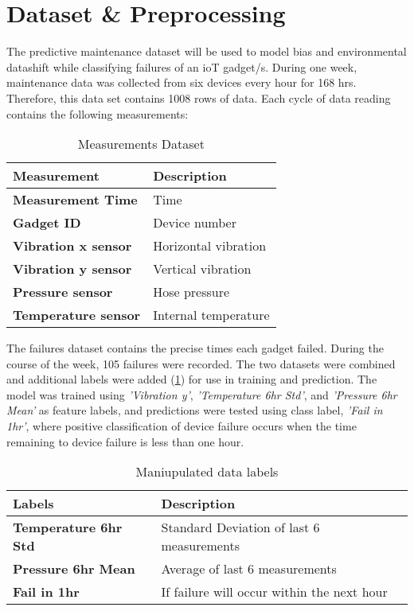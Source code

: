 \section{Dataset \& Preprocessing}
The predictive maintenance dataset \cite{ahonen} will be used to model bias and environmental datashift while classifying failures of an ioT gadget/s.
During one week, maintenance data was collected from six devices every hour for 168 hrs.
Therefore, this data set contains 1008 rows of data. 
Each cycle of data reading contains the following measurements: 

\begin{table}[H]
    \begin{center}
        \caption{Measurements Dataset} 
        \begin{tabular}{ ll } 
         \toprule
         \textbf{Measurement} & \textbf{Description} \\  [0.5ex] 
         \midrule
         \textbf{Measurement Time} & Time \\
         \textbf{Gadget ID} & Device number \\
         \textbf{Vibration x sensor} & Horizontal vibration \\ 
         \textbf{Vibration y sensor} & Vertical vibration \\ 
         \textbf{Pressure sensor} & Hose pressure \\
         \textbf{Temperature sensor} & Internal temperature \\
         \bottomrule
        \end{tabular}
    \end{center}
\end{table}

The failures dataset contains the precise times each gadget failed. 
During the course of the week, 105 failures were recorded. 
The two datasets were combined and additional labels were added (\ref{table:labels}) for use in training and prediction.
The model was trained using \textit{'Vibration y'}, \textit{'Temperature 6hr Std'}, 
and \textit{'Pressure 6hr Mean'} as feature labels, and predictions were tested using class label, \textit{'Fail in 1hr'},
where positive classification of device failure occurs when the time remaining to device failure is less than one hour.

\begin{table}[H]
    \begin{center}
        \caption{Maniupulated data labels}
        \label{table:labels} 
        \begin{tabular}{ll}
            \toprule
            \textbf{Labels} & \textbf{Description} \\ [0.5ex]
            \midrule
            \textbf{Temperature 6hr Std} & Standard Deviation of last 6 measurements \\
            \textbf{Pressure 6hr Mean} & Average of last 6 measurements \\
            \textbf{Fail in 1hr} & If failure will occur within the next hour \\
            \bottomrule
        \end{tabular}
    \end{center}
\end{table}

